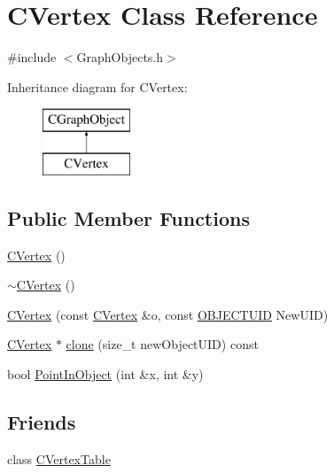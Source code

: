 \hypertarget{class_c_vertex}{}\section{C\+Vertex Class Reference}
\label{class_c_vertex}


{\ttfamily \#include $<$Graph\+Objects.\+h$>$}

Inheritance diagram for C\+Vertex\+:\begin{figure}[H]
\begin{center}
\leavevmode
\includegraphics[height=2.000000cm]{class_c_vertex}
\end{center}
\end{figure}
\subsection*{Public Member Functions}
\begin{DoxyCompactItemize}
\item 
\hyperlink{class_c_vertex_a66e03f4bdcf29262928e10a4f7228413}{C\+Vertex} ()
\item 
\hyperlink{class_c_vertex_a1654f6edcbdec4fd207bac4af663aa56}{$\sim$\+C\+Vertex} ()
\item 
\hyperlink{class_c_vertex_a481f2fec54490fc5c32ce0627a98e748}{C\+Vertex} (const \hyperlink{class_c_vertex}{C\+Vertex} \&o, const \hyperlink{_object_database_defines_8h_a164ec120b01429b93c9cd0bef2a67e64}{O\+B\+J\+E\+C\+T\+U\+I\+D} New\+U\+I\+D)
\item 
\hyperlink{class_c_vertex}{C\+Vertex} $\ast$ \hyperlink{class_c_vertex_aea6413396ee1db9d3ba01d224697c4f1}{clone} (size\+\_\+t new\+Object\+U\+I\+D) const 
\item 
bool \hyperlink{class_c_vertex_aa3633f7a128829bb28cd8b28e4a759ed}{Point\+In\+Object} (int \&x, int \&y)
\end{DoxyCompactItemize}
\subsection*{Friends}
\begin{DoxyCompactItemize}
\item 
class \hyperlink{class_c_vertex_a1d86cbedc9bc2eb368c4ef78ee139e3d}{C\+Vertex\+Table}
\end{DoxyCompactItemize}
